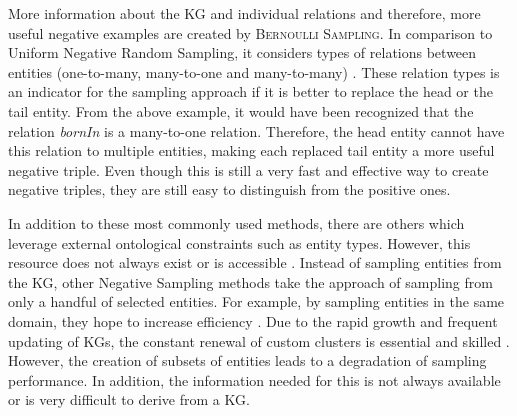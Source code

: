 More information about the \ac{KG} and individual relations and therefore, more useful negative examples are created by \textsc{Bernoulli Sampling}.
In comparison to Uniform Negative Random Sampling, it considers types of relations between entities (one-to-many, many-to-one and many-to-many) \cite{zhang2021efficient}.
These relation types is an indicator for the sampling approach if it is better to replace the head or the tail entity.
From the above example, it would have been recognized that the relation \textit{bornIn} is a many-to-one relation.
Therefore, the head entity cannot have this relation to multiple entities, making each replaced tail entity a more useful negative triple.
Even though this is still a very fast and effective way to create negative triples, they are still easy to distinguish from the positive ones.

In addition to these most commonly used methods, there are others which leverage external ontological constraints such as entity types.
However, this resource does not always exist or is accessible \cite{cai2017kbgan}.
Instead of sampling entities from the \ac{KG}, other Negative Sampling methods take the approach of sampling from only a handful of selected entities.
For example, by sampling entities in the same domain, they hope to increase efficiency \cite{qiannegative}.
Due to the rapid growth and frequent updating of \acp{KG}, the constant renewal of custom clusters is essential and skilled \cite{qiannegative}. 
However, the creation of subsets of entities leads to a degradation of sampling performance.
In addition, the information needed for this is not always available or is very difficult to derive from a \ac{KG}.









